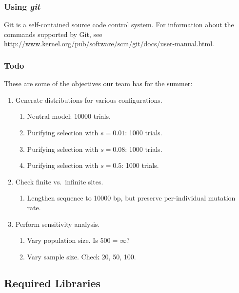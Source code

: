 \documentclass{article}
\begin{document}
      \subsubsection{Using {\em git}}
        \label{sec:git}

        Git is a self-contained source code control system. For information
        about the commands supported by Git, see
        \url{http://www.kernel.org/pub/software/scm/git/docs/user-manual.html}.

      \subsubsection{Todo}
        \label{sec:todo}

        These are some of the objectives our team has for the summer:

        \begin{enumerate}
          \item Generate distributions for various configurations.
            \begin{enumerate}
              \item Neutral model: 10000 trials.
              \item Purifying selection with $s=0.01$: 1000 trials.
              \item Purifying selection with $s=0.08$: 1000 trials.
              \item Purifying selection with $s=0.5$: 1000 trials.
            \end{enumerate}

          \item Check finite vs.\ infinite sites.
            \begin{enumerate}
              \item Lengthen sequence to 10000 bp, but preserve per-individual
              mutation rate.
            \end{enumerate}

          \item Perform sensitivity analysis.
            \begin{enumerate}
              \item Vary population size. Is $500 = \infty$?
              \item Vary sample size. Check 20, 50, 100.
            \end{enumerate}
        \end{enumerate}

    \subsection{Required Libraries}
      \label{sec:libraries}
\end{document}
